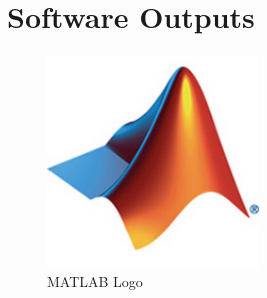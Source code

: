 \documentclass{article}
\begin{document}

% 
% 
% 
% 

\section{Software Outputs}
\begin{figure}[h]
    \centering
    \includegraphics[width=0.5\textwidth]{misc_media/Matlab-Logo.jpg}
    \caption{MATLAB Logo}  %
    \label{fig:matlab-logo} %
\end{figure}

\vspace{2cm}  %


% 





% 
\end{document}
